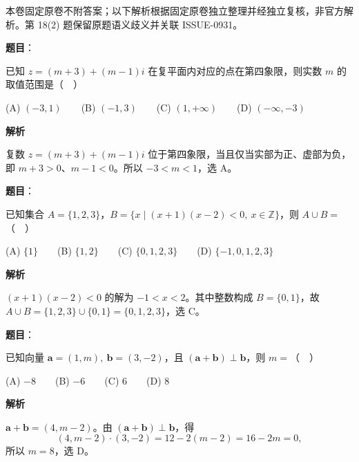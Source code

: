 

\begin{gktip}
本卷固定原卷不附答案；以下解析根据固定原卷独立整理并经独立复核，非官方解析。第 18(2) 题保留原题语义歧义并关联 ISSUE-0931。
\end{gktip}


\begin{answer}

\textbf{题目}：

已知 \(z=(m+3)+(m-1)i\) 在复平面内对应的点在第四象限，则实数 \(m\) 的取值范围是（　）

   (A) \((-3,1)\)　　(B) \((-1,3)\)　　(C) \((1,+\infty)\)　　(D) \((-\infty,-3)\)

\textbf{解析}

复数 \(z=(m+3)+(m-1)i\) 位于第四象限，当且仅当实部为正、虚部为负，即 \(m+3>0\)、\(m-1<0\)。所以 \(-3<m<1\)，选 A。


\end{answer}
\begin{answer}

\textbf{题目}：

已知集合 \(A=\{1,2,3\}\)，\(B=\{x\mid(x+1)(x-2)<0,\ x\in\mathbb Z\}\)，则 \(A\cup B=\)（　）

   (A) \(\{1\}\)　　(B) \(\{1,2\}\)　　(C) \(\{0,1,2,3\}\)　　(D) \(\{-1,0,1,2,3\}\)

\textbf{解析}

\((x+1)(x-2)<0\) 的解为 \(-1<x<2\)。其中整数构成 \(B=\{0,1\}\)，故 \(A\cup B=\{1,2,3\}\cup\{0,1\}=\{0,1,2,3\}\)，选 C。


\end{answer}
\begin{answer}

\textbf{题目}：

已知向量 \(\boldsymbol a=(1,m),\ \boldsymbol b=(3,-2)\)，且 \((\boldsymbol a+\boldsymbol b)\perp\boldsymbol b\)，则 \(m=\)（　）

   (A) \(-8\)　　(B) \(-6\)　　(C) \(6\)　　(D) \(8\)

\textbf{解析}

\(\boldsymbol a+\boldsymbol b=(4,m-2)\)。由 \((\boldsymbol a+\boldsymbol b)\perp\boldsymbol b\)，得
\nopagebreak[4]
\[
(4,m-2)\cdot(3,-2)=12-2(m-2)=16-2m=0,
\]
所以 \(m=8\)，选 D。


\end{answer}
